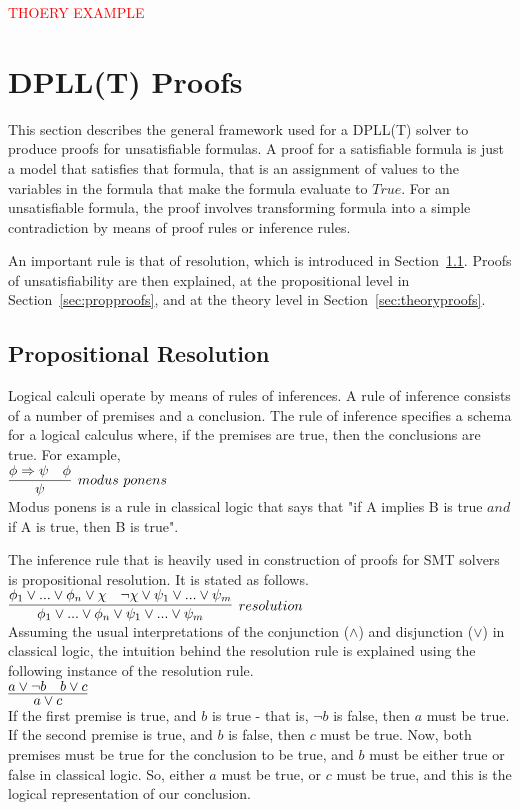 \documentclass{article}
\begin{document}
\textcolor{red}{THOERY EXAMPLE}

\section{DPLL(T) Proofs}
\label{sec:proofs}
This section describes the general framework used for a 
DPLL(T) solver to produce proofs for unsatisfiable formulas. 
A proof for a satisfiable formula is just a model that 
satisfies that formula, that is an assignment of values to 
the variables in the formula that make the formula evaluate 
to $True$. For an unsatisfiable formula, the proof involves 
transforming formula into a simple contradiction by means 
of proof rules or inference rules. 

An important rule is that of resolution, which is introduced 
in Section~\ref{sec:res}. Proofs of unsatisfiability are then 
explained, at the propositional level in 
Section~\ref{sec:propproofs}, and at the theory level in 
Section~\ref{sec:theoryproofs}.

\subsection{Propositional Resolution}
\label{sec:res}
Logical calculi operate by means of rules of inferences. A
rule of inference consists of a number of premises and a 
conclusion. The rule of inference specifies a schema for a 
logical calculus where, if the premises are true, then 
the conclusions are true. For example, \\
$\infer[modus\ ponens]{\psi}{\phi \Rightarrow \psi & \phi}$ \\
Modus ponens is a rule in classical logic that says that 
"if A implies B is true $and$ if A is true, then B is true".

The inference rule that is heavily used in construction of 
proofs for SMT solvers is propositional resolution. It is
stated as follows. \\
$\infer[resolution]{\phi_1 \lor ... \lor \phi_n \lor \psi_1 \lor ... \lor \psi_m}
{\phi_1 \lor ... \lor \phi_n \lor \chi & \neg \chi \lor \psi_1 \lor ... \lor \psi_m}$ \\

Assuming the usual interpretations of the conjunction
($\land$) and disjunction ($\lor$) in classical logic, the 
intuition behind the resolution rule is explained using the 
following instance of the resolution rule. \\
$\infer{a \lor c}{a \lor \neg b & b \lor c}$ \\
If the first premise is true, and $b$ is true - that is, 
$\neg b$ is false, then $a$ must be true. If the second 
premise is true, and $b$ is false, then $c$ must be true.
Now, both premises must be true for the conclusion to be true, 
and $b$ must be either true or false in classical logic. 
So, either $a$ must be true, or $c$ must be true, and this 
is the logical representation of our conclusion.
\end{document}
